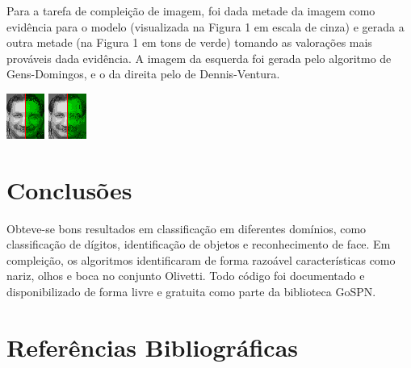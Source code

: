\documentclass[10pt,a4paper]{article}
\newenvironment{Figure}
  {\par\noindent\minipage{\linewidth}}
  {\endminipage\par}
\begin{document}
\begin{multicols*}{2}
Para a tarefa de compleição de imagem, foi dada metade da imagem como evidência para o modelo
(visualizada na Figura 1 em escala de cinza) e gerada a outra metade (na Figura 1 em tons de
verde) tomando as valorações mais prováveis dada evidência. A imagem da esquerda foi gerada pelo
algoritmo de Gens-Domingos, e o da direita pelo de Dennis-Ventura.
\begin{Figure}
  \centering\includegraphics[scale=8.0]{imgs/gens_cmpl.png}
  \includegraphics[scale=1.925]{imgs/dennis_cmpl.png}\\
  \vspace{-0.2cm}
\end{Figure}

\section*{Conclusões}

Obteve-se bons resultados em classificação em diferentes domínios, como classificação de dígitos,
identificação de objetos e reconhecimento de face. Em compleição, os algoritmos identificaram
de forma razoável características como nariz, olhos e boca no conjunto Olivetti. Todo código foi
documentado e disponibilizado de forma livre e gratuita como parte da biblioteca GoSPN\@.

\section*{Referências Bibliográficas}

\AtNextBibliography{\fontsize{10pt}{12.0}\selectfont}
\printbibliography[heading=none]

\end{multicols*}
\end{document}
